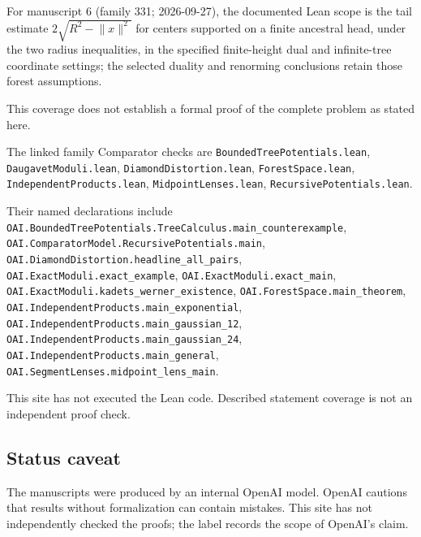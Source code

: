 \documentclass[11pt]{article}
\begin{document}
For manuscript 6 (family 331; 2026-09-27), the documented Lean scope is the tail estimate $2\sqrt{R^2-\lVert x\rVert^2}$ for centers supported on a finite ancestral head, under the two radius inequalities, in the specified finite-height dual and infinite-tree coordinate settings; the selected duality and renorming conclusions retain those forest assumptions.

This coverage does not establish a formal proof of the complete problem as stated here.

The linked family Comparator checks are \texttt{BoundedTreePotentials.lean}, \texttt{DaugavetModuli.lean}, \texttt{DiamondDistortion.lean}, \texttt{ForestSpace.lean}, \texttt{IndependentProducts.lean}, \texttt{MidpointLenses.lean}, \texttt{RecursivePotentials.lean}.

Their named declarations include \texttt{OAI.BoundedTreePotentials.TreeCalculus.main\_counterexample}, \texttt{OAI.ComparatorModel.RecursivePotentials.main}, \texttt{OAI.DiamondDistortion.headline\_all\_pairs}, \texttt{OAI.ExactModuli.exact\_example}, \texttt{OAI.ExactModuli.exact\_main}, \texttt{OAI.ExactModuli.kadets\_werner\_existence}, \texttt{OAI.ForestSpace.main\_theorem}, \texttt{OAI.IndependentProducts.main\_exponential}, \texttt{OAI.IndependentProducts.main\_gaussian\_12}, \texttt{OAI.IndependentProducts.main\_gaussian\_24}, \texttt{OAI.IndependentProducts.main\_general}, \texttt{OAI.SegmentLenses.midpoint\_lens\_main}.

This site has not executed the Lean code. Described statement coverage is not an independent proof check.

\subsection{Status caveat}
The manuscripts were produced by an internal OpenAI model. OpenAI cautions that results without formalization can contain mistakes. This site has not independently checked the proofs; the label records the scope of OpenAI's claim.
\end{document}
